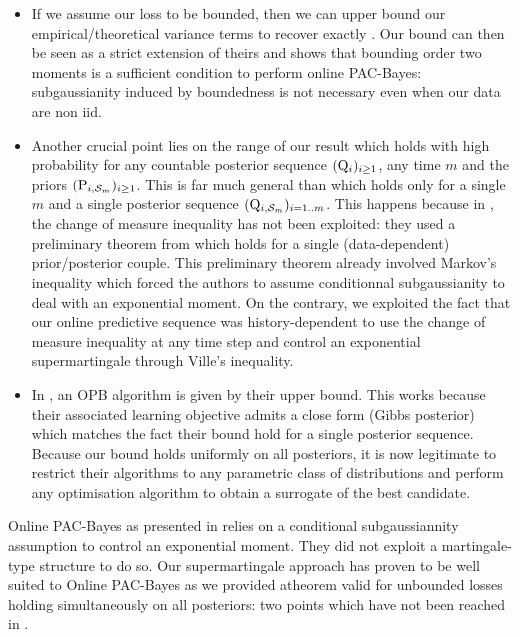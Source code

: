 \begin{itemize}
  \item If we assume our loss to be bounded, then we can upper bound our empirical/theoretical variance terms to recover exactly \citet[][Theorem 2.3]{haddouche2022online}. Our bound can then be seen as a strict extension of theirs and shows that bounding order two moments is a sufficient condition to perform online PAC-Bayes: subgaussianity induced by boundedness is not necessary even when our data are non iid.
  \item Another crucial point lies on the range of our result which holds with high probability for any countable posterior sequence $(\mathrm{Q}_{i})_{i\geq 1}$, any time $m$ and the priors $(\mathrm{P}_{i,\mathcal{S}_m})_{i\geq 1}$.
  This is far much general than \citet[][Theorem 2.3]{haddouche2022online} which holds only for a single $m$ and a single posterior sequence $(\mathrm{Q}_{i,\mathcal{S}_m})_{i=1..m}$. This happens because in \citet{haddouche2022online}, the change of measure inequality has not been exploited: they used a preliminary theorem from \citet{rivasplata2020pac} which holds for a single (data-dependent) prior/posterior couple. This preliminary theorem already involved Markov's inequality which forced the authors to assume conditionnal subgaussianity to deal with an exponential moment. On the contrary, we exploited the fact that our online predictive sequence was history-dependent to use the change of measure inequality at any time step and control an exponential supermartingale through Ville's inequality.
  \item In \citet[Eq. 1]{haddouche2022online}, an OPB algorithm is given by their upper bound. This works because their associated learning objective admits a close form (Gibbs posterior) which matches the fact their bound hold for a single posterior sequence. Because our bound holds uniformly on all posteriors, it is now legitimate to restrict their algorithms to any parametric class of distributions and perform any optimisation algorithm to obtain a surrogate of the best candidate.
\end{itemize}

 Online PAC-Bayes as presented in \citet{haddouche2022online} relies on a conditional subgaussiannity assumption to control an exponential moment. They did not exploit a martingale-type structure to do so. Our supermartingale approach has proven to be well suited to Online PAC-Bayes as we provided atheorem valid for unbounded losses holding simultaneously on all posteriors: two points which have not been reached in \citet{haddouche2022online}.

